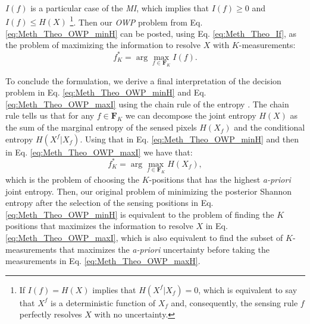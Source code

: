 $I(f)$ is a particular case of the \emph{MI}, which implies that $I(f)\geq 0$ and $I(f) \leq H(X)$ \footnote{If $I(f) = H(X)$ implies that $H(X^f|X_f)=0$, which is equivalent to say that $X^f$ is a deterministic function of  $X_f$ \cite{cover2006elements} and, consequently,  the sensing rule $f$ perfectly resolves $X$ with no uncertainty.}. Then our \emph{OWP} problem from Eq. \eqref{eq:Meth_Theo_OWP_minH} can be posted, using Eq. \eqref{eq:Meth_Theo_If}, as the problem of maximizing the information to resolve $X$ with $K$-measurements: 
\begin{equation}\label{eq:Meth_Theo_OWP_maxI}
	f^{*}_{K} = \arg \max_{f \in \mathbf{F}_{K}} 	I(f) . 
\end{equation}

To conclude the formulation,  we derive a final interpretation of the decision problem in Eq. \eqref{eq:Meth_Theo_OWP_minH} and Eq. \eqref{eq:Meth_Theo_OWP_maxI} using the chain rule of the entropy \cite{cover2006elements}.  The chain rule tells us that for any $f\in \mathbf{F}_{K}$ we can decompose the joint entropy $H(X)$ as the sum of  the marginal entropy of the sensed pixels $H(X_f)$ and the conditional entropy $H(X^{f}|X_{f})$.  Using that in Eq. \eqref{eq:Meth_Theo_OWP_minH} and then in Eq. \eqref{eq:Meth_Theo_OWP_maxI} we have that: 
\begin{equation}\label{eq:Meth_Theo_OWP_maxH}
	f^{*}_{K} = \arg \max_{f\in \mathbf{F}_{K}} 	H(X_{f}) , 
\end{equation} 
which is the problem of choosing the $K$-positions that has the highest \emph{a-priori} joint entropy. Then, our original problem of minimizing the posterior Shannon entropy after the selection of the sensing positions in Eq. \eqref{eq:Meth_Theo_OWP_minH} is equivalent to the problem of finding the $K$ positions that maximizes the information to resolve $X$ in Eq. \eqref{eq:Meth_Theo_OWP_maxI}, which is also equivalent to find the subset of $K$-measurements that maximizes the \emph{a-priori} uncertainty before taking the measurements in Eq. \eqref{eq:Meth_Theo_OWP_maxH}.






















































